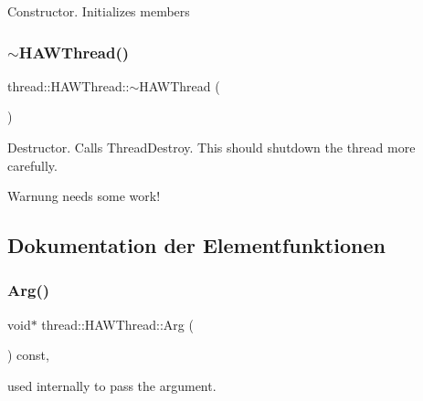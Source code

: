 Constructor. Initializes members \hypertarget{classthread_1_1_h_a_w_thread_a84706dda23aa384a43ced901381e795b}{}\label{classthread_1_1_h_a_w_thread_a84706dda23aa384a43ced901381e795b} 
\subsubsection{\texorpdfstring{$\sim$\+H\+A\+W\+Thread()}{~HAWThread()}}
{\footnotesize\ttfamily thread\+::\+H\+A\+W\+Thread\+::$\sim$\+H\+A\+W\+Thread (\begin{DoxyParamCaption}{ }\end{DoxyParamCaption})\hspace{0.3cm}{\ttfamily [virtual]}}

Destructor. Calls Thread\+Destroy. This should shutdown the thread more carefully. \begin{DoxyWarning}{Warnung}
needs some work! 
\end{DoxyWarning}


\subsection{Dokumentation der Elementfunktionen}
\hypertarget{classthread_1_1_h_a_w_thread_a87d9850bda803fafa714c32a63c11a89}{}\label{classthread_1_1_h_a_w_thread_a87d9850bda803fafa714c32a63c11a89} 
\subsubsection{\texorpdfstring{Arg()}{Arg()}\hspace{0.1cm}{\footnotesize\ttfamily [1/2]}}
{\footnotesize\ttfamily void$\ast$ thread\+::\+H\+A\+W\+Thread\+::\+Arg (\begin{DoxyParamCaption}{ }\end{DoxyParamCaption}) const\hspace{0.3cm}{\ttfamily [inline]}, {\ttfamily [protected]}}

used internally to pass the argument. \hypertarget{classthread_1_1_h_a_w_thread_a368c07a801fb8f5e7bb181d2453df4be}{}\label{classthread_1_1_h_a_w_thread_a368c07a801fb8f5e7bb181d2453df4be} 
